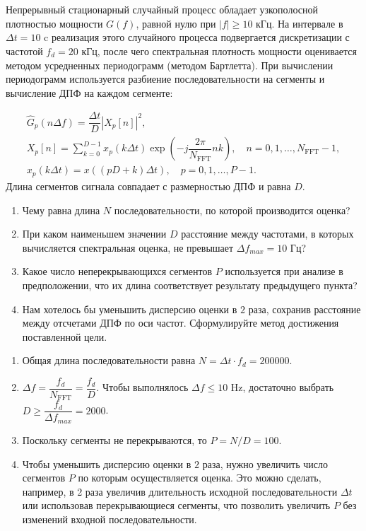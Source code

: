\protect\thispagestyle{fancy}
\section{}
Непрерывный стационарный случайный процесс обладает узкополосной плотностью мощности $G(f)$, равной нулю при $|f|\geq10$ кГц.
На интервале в $\Delta t = 10$ c реализация этого случайного процесса подвергается дискретизации с частотой
$f_d = 20$ кГц, после чего спектральная плотность мощности оценивается методом усредненных периодограмм (методом Бартлетта). При вычислении периодограмм используется разбиение последовательности на сегменты и вычисление ДПФ на каждом сегменте:

\begin{gather*}
\hat{G}_p(n\Delta f) = \dfrac{\Delta t}{D} |X_p[n]|^2,\\
X_p[n] = \sum\limits_{k=0}^{D-1}x_p(k\Delta t)\exp\left(-j\dfrac{2\pi}{N_{\text{FFT}}}nk\right),
\quad n=0, 1, \ldots, N_{\text{FFT}}-1,\\
x_p(k\Delta t) = x\left((pD+k)\Delta t\right),\quad p=0,1,\ldots, P-1.
\end{gather*}
Длина сегментов сигнала совпадает с размерностью ДПФ и равна $D$.


\begin{enumerate}[label=(\alph*)]
	\item Чему равна длина $N$ последовательности, по которой производится оценка?
	\item При каком наименьшем значении $D$ расстояние между частотами,	в которых вычисляется спектральная оценка, не превышает $\Delta f_{max} = 10$ Гц?
	\item Какое число неперекрывающихся сегментов $P$ используется при анализе в предположении, что их длина соответствует результату предыдущего пункта?
	\item Нам хотелось бы уменьшить дисперсию оценки в $2$ раза, сохранив	расстояние между отсчетами ДПФ по оси частот. Сформулируйте метод достижения поставленной цели.
\end{enumerate}

\vspace{1cm}
\begin{enumerate}[label=(\alph*)]
	\item Общая длина последовательности равна $N = \Delta t \cdot f_d = 200000$.
	\item $\Delta f = \dfrac{f_d}{N_{\text{FFT}}} = \dfrac{f_d}{D}$. Чтобы выполнялось $\Delta f \leq 10$ Hz, достаточно выбрать $D \geq \dfrac{f_d}{\Delta f_{max}} = 2000$.
	\item Поскольку сегменты не перекрываются, то $P = N/D = 100$.
	\item Чтобы уменьшить дисперсию оценки в $2$ раза, нужно увеличить число сегментов $P$ по которым осуществляется оценка. Это можно сделать, например, в 2 раза увеличив длительность исходной последовательности $\Delta t$ или использовав перекрывающиеся сегменты, что позволить увеличить $P$ без изменений входной последовательности.
\end{enumerate}

